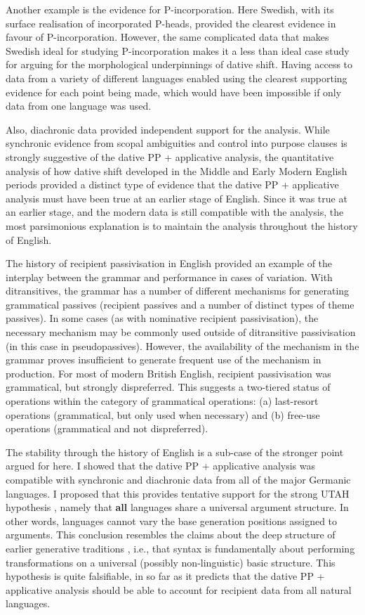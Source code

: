 Another example is the evidence for P-incorporation. Here Swedish, with its surface realisation of incorporated P-heads, provided the clearest evidence in favour of P-incorporation. However, the same complicated data that makes Swedish ideal for studying P-incorporation makes it a less than ideal case study for arguing for the morphological underpinnings of dative shift. Having access to data from a variety of different languages enabled using the clearest supporting evidence for each point being made, which would have been impossible if only data from one language was used.

Also, diachronic data provided independent support for the analysis. While synchronic evidence from scopal ambiguities and control into purpose clauses is strongly suggestive of the dative PP + applicative analysis, the quantitative analysis of how dative shift developed in the Middle and Early Modern English periods provided a distinct type of evidence that the dative PP + applicative analysis must have been true at an earlier stage of English. Since it was true at an earlier stage, and the modern data is still compatible with the analysis, the most parsimonious explanation is to maintain the analysis throughout the history of English.

The history of recipient passivisation in English provided an example of the interplay between the grammar and performance in cases of variation. With ditransitives, the grammar has a number of different mechanisms for generating grammatical passives (recipient passives and a number of distinct types of theme passives). In some cases (as with nominative recipient passivisation), the necessary mechanism may be commonly used outside of ditransitive passivisation (in this case in pseudopassives). However, the availability of the mechanism in the grammar proves insufficient to generate frequent use of the mechanism in production. For most of modern British English, recipient passivisation was grammatical, but strongly dispreferred. This suggests a two-tiered status of operations within the category of grammatical operations: (a) last-resort operations (grammatical, but only used when necessary) and (b) free-use operations (grammatical and not dispreferred).

The stability through the history of English is a sub-case of the stronger point argued for here. I showed that the dative PP + applicative analysis was compatible with synchronic and diachronic data from all of the major Germanic languages. I proposed that this provides tentative support for the strong UTAH hypothesis \citep{Baker.1988}, namely that \textbf{all} languages share a universal argument structure. In other words, languages cannot vary the base generation positions assigned to arguments. This conclusion resembles the claims about the deep structure of earlier generative traditions \citep{Chomsky.1965,Chomsky.1981}, i.e., that syntax is fundamentally about performing transformations on a universal (possibly non-linguistic) basic structure. This hypothesis is quite falsifiable, in so far as it predicts that the dative PP + applicative analysis should be able to account for recipient data from all natural languages.

